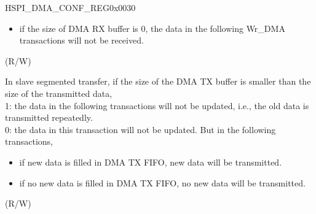 \begin{register}{H}{SPI\_DMA\_CONF\_REG}{0x0030}
\begin{regdesc}
\begin{reglist}
\begin{itemize}
    \item if the size of DMA RX buffer is 0, the data in the following Wr\_DMA transactions will not be received.
\end{itemize}
(R/W)
\label{fielddesc:SPISLVTXSEGTRANSCLREN}\item [SPI\_SLV\_TX\_SEG\_TRANS\_CLR\_EN] In slave segmented transfer, if the size of the DMA TX buffer is smaller than the size of the transmitted data, \\
1: the data in the following transactions will not be updated, i.e., the old data is transmitted repeatedly. \\
0: the data in this transaction will not be updated. But in the following transactions,
    \begin{itemize}
        \item if new data is filled in DMA TX FIFO, new data will be transmitted.
        \item if no new data is filled in DMA TX FIFO, no new data will be transmitted.
    \end{itemize}
(R/W)

\item [Continued on the next page...]
\end{reglist}\end{regdesc}
\end{register}

